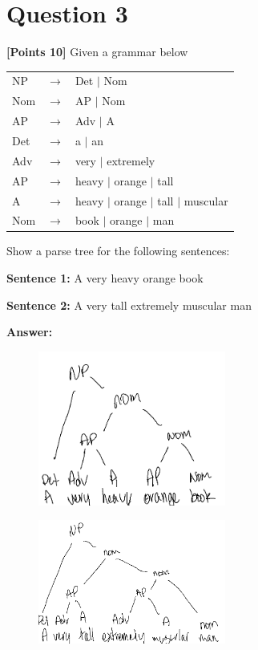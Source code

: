 \documentclass[12pt]{article}
\begin{document}
\newpage
\section*{Question 3}
\textbf{[Points 10]} Given a grammar below

\begin{tabular}{lll}
      \hline
      NP  & $\rightarrow$ & Det $|$ Nom                            \\
      Nom & $\rightarrow$ & AP $|$ Nom                             \\
      AP  & $\rightarrow$ & Adv $|$ A                              \\
      \hline
      Det & $\rightarrow$ & a $|$ an                               \\
      Adv & $\rightarrow$ & very $|$ extremely                     \\
      AP  & $\rightarrow$ & heavy $|$ orange $|$ tall              \\
      A   & $\rightarrow$ & heavy $|$ orange $|$ tall $|$ muscular \\
      Nom & $\rightarrow$ & book $|$ orange $|$ man                \\
      \hline
\end{tabular}

Show a parse tree for the following sentences:

\textbf{Sentence 1:} A very heavy orange book

\textbf{Sentence 2:} A very tall extremely muscular man

\textbf{Answer:}

\begin{figure}[!ht]
      \centering
      \includegraphics[width=0.55\textwidth]{assets/test2/p3a.png}
\end{figure}

\begin{figure}[!ht]
      \centering
      \includegraphics[width=0.55\textwidth]{assets/test2/p3b.png}
\end{figure}
\end{document}
